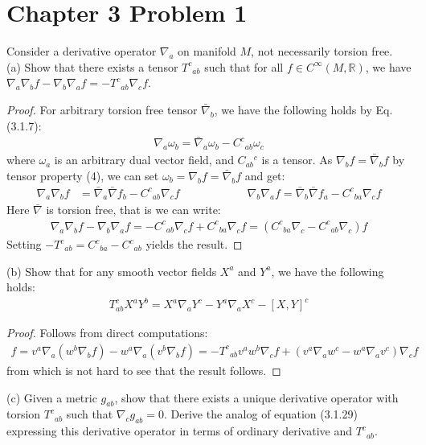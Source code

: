 \documentclass[11pt, onesided]{book}
\theoremstyle{break}
\theoremstyle{break}
\newcommand{\R}{\mathbb{R}}
\begin{document}
\newpage
\section{Chapter 3 Problem 1}
Consider a derivative operator $\nabla_a$ on manifold $M$, not necessarily torsion free. \\

(a) Show that there exists a tensor $T^c{}_{ab}$ such that for all $f \in C^\infty(M, \R)$, we have $\nabla_a \nabla_b f  - \nabla_b\nabla_a f = -T^c{}_{ab} \nabla_cf$. 
\begin{proof}
For arbitrary torsion free tensor $\bar{\nabla}_b$, we have the following holds by Eq. (3.1.7):
\begin{align*}
\nabla_a \omega_b = \bar{\nabla}_a \omega_b - C^c{}_{ab}\omega_c
\end{align*}
where $\omega_a$ is an arbitrary dual vector field, and $C_{ab}{}^c$ is a tensor. As $ {\nabla_b} f =\bar{\nabla}_b f $ by tensor property (4), we can set $\omega_b = {\nabla_b} f =\bar{\nabla}_b f $ and get:
\begin{align*}
\nabla_a \nabla_b f &= \bar{\nabla}_a \bar{\nabla} f_b - C^c{}_{ab}\nabla_c f \qquad\qquad\qquad 
\nabla_b \nabla_a f = \bar{\nabla}_b \bar{\nabla} f_a - C^c{}_{ba}\nabla_c f 
\end{align*}
Here $\bar{\nabla}$ is torsion free, that is we can write:
\begin{align*}
\nabla_a \nabla_b f - \nabla_b \nabla_a f = -C^c{}_{ab}\nabla_c f + C^c{}_{ba}\nabla_c f = (C^c{}_{ba}\nabla_c -C^c{}_{ab}\nabla_c)f
\end{align*}
Setting $-T^c{}_{ab} = C^c{}_{ba} -C^c{}_{ab}{}$ yields the result. 
\end{proof}
(b) Show that for any smooth vector fields $X^a$ and $Y^a$, we have the following holds:
\begin{align*}
T^{c}_{ab} X^aY^b = X^a\nabla_aY^c - Y^a \nabla_a X^c - [X,Y]^c
\end{align*}
\begin{proof}
\color{red}
Follows from direct computations:
\begin{align*}
[v,w]f = v^a \nabla_a (w^b \nabla_b f)- w^a \nabla_a (v^b \nabla_b f)= -T^c{}_{ab}v^aw^b \nabla_c f + (v^a \nabla_a w^c - w^a \nabla_a v^c) \nabla_c f
\end{align*}
from which is not hard to see that the result follows. 
\color{black}
\end{proof}

(c) Given a metric $g_{ab}$, show that there exists a unique derivative operator with torsion $T^c{}_{ab}$ such that $\nabla_cg_{ab} = 0$. Derive the analog of equation (3.1.29) expressing this derivative operator in terms of ordinary derivative and $T^c{}_{ab}$.\\
\end{document}
